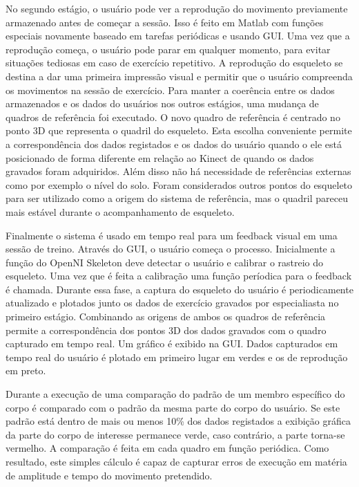 No segundo estágio, o usuário pode ver a reprodução do movimento previamente armazenado
antes de começar a sessão. Isso é feito em Matlab com funções especiais novamente 
baseado em tarefas periódicas e usando GUI. Uma vez que a reprodução começa, o usuário
pode parar em qualquer momento, para evitar situações tediosas em caso de exercício
repetitivo. A reprodução do esqueleto se destina a dar uma primeira impressão visual
e permitir que o usuário compreenda os movimentos na sessão de exercício. Para manter
a coerência entre os dados armazenados e os dados do usuários nos outros estágios,
uma mudança de quadros de referência foi executado. O novo quadro de referência
é centrado no ponto 3D que representa o quadril do esqueleto. 
Esta escolha conveniente permite a correspondência dos dados registados e os dados
 do usuário quando o ele está posicionado de forma diferente em relação ao Kinect
 de quando os dados gravados foram adquiridos. Além disso não há necessidade 
de referências externas como por exemplo o nível do solo. Foram considerados outros
 pontos do esqueleto para ser utilizado como a origem do sistema de referência, 
mas o quadril pareceu mais estável durante o acompanhamento de esqueleto.

Finalmente o sistema é usado em tempo real para um feedback visual em uma sessão 
de treino. Através do GUI, o usuário começa o processo. Inicialmente a função do 
 OpenNI Skeleton deve detectar o usuário e calibrar o rastreio do esqueleto. Uma
vez que é feita a calibração uma função períodica para o feedback é chamada. Durante
essa fase, a captura do esqueleto do usuário é periodicamente atualizado e plotados 
junto os dados de exercício gravados por especialiasta no primeiro estágio. Combinando
 as origens de ambos os quadros de referência permite a correspondência dos pontos 3D
 dos dados gravados com o quadro capturado em tempo real. Um gráfico é exibido na GUI.
 Dados capturados em tempo real do usuário é plotado em primeiro lugar em verdes 
e os de reprodução em preto.

Durante a execução de uma comparação do padrão de um membro específico do corpo
 é comparado com o padrão da mesma parte do corpo do usuário. Se este padrão está
 dentro de mais ou menos 10\% dos dados registados a exibição gráfica da parte 
do corpo de interesse permanece verde, caso contrário, a parte torna-se vermelho.
A comparação é feita em cada quadro em função periódica. Como resultado, este simples
cálculo é capaz de capturar erros de execução em matéria de amplitude e tempo do
movimento pretendido.\cite{roberto}

